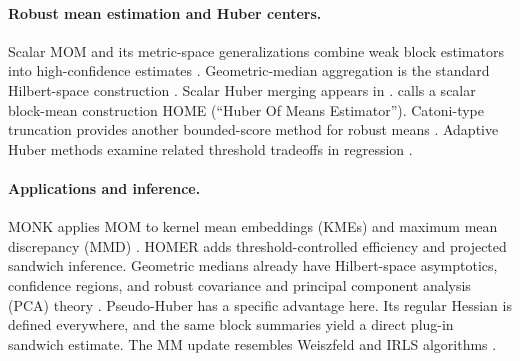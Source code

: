 \documentclass[twoside]{article}
\theoremstyle{definition}
\begin{document}
\paragraph{Robust mean estimation and Huber centers.}
Scalar MOM and its metric-space generalizations combine weak block estimators into high-confidence estimates \citep{nemirovskij_1983_ProblemComplexityMethod,jerrum_1986_RandomGenerationCombinatorial,alon_1999_SpaceComplexityApproximating,hsu_2016_LossMinimizationParameter,minsker_2015_GeometricMedianRobust}. Geometric-median aggregation is the standard Hilbert-space construction \citep{minsker_2024_GeometricMedianApplications}. Scalar Huber merging appears in \citet{minsker_2019_DistributedStatisticalEstimation}. \citet{mathieu_2021_MestimationMedianMeans} calls a scalar block-mean construction HOME (``Huber Of Means Estimator''). Catoni-type truncation provides another bounded-score method for robust means \citep{catoni_2012_ChallengingEmpiricalMean,catoni_2018_DimensionfreePACBayesianBounds}. Adaptive Huber methods examine related threshold tradeoffs in regression \citep{sun_2020_AdaptiveHuberRegression,wang_2021_NewPrincipleTuningFree}.

\paragraph{Applications and inference.}
MONK applies MOM to kernel mean embeddings (KMEs) and maximum mean discrepancy (MMD) \citep{lerasle_2019_MONKOutlierRobustMean}. HOMER adds threshold-controlled efficiency and projected sandwich inference. Geometric medians already have Hilbert-space asymptotics, confidence regions, and robust covariance and principal component analysis (PCA) theory \citep{cardot_2013_EfficientFastEstimation,cardot_2017_OnlineEstimationGeometric,cardot_2017_FastEstimationMedian}. Pseudo-Huber has a specific advantage here. Its regular Hessian is defined everywhere, and the same block summaries yield a direct plug-in sandwich estimate. The MM update resembles Weiszfeld and IRLS algorithms \citep{beck_2015_WeiszfeldsMethodOld}. 




\end{document}
